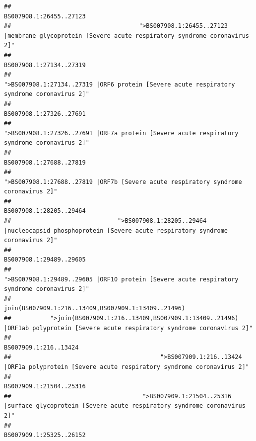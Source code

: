 \documentclass[
]{article}
\begin{document}
\begin{verbatim}
##                                                                                                                BS007908.1:26455..27123 
##                                    ">BS007908.1:26455..27123 |membrane glycoprotein [Severe acute respiratory syndrome coronavirus 2]" 
##                                                                                                                BS007908.1:27134..27319 
##                                             ">BS007908.1:27134..27319 |ORF6 protein [Severe acute respiratory syndrome coronavirus 2]" 
##                                                                                                                BS007908.1:27326..27691 
##                                            ">BS007908.1:27326..27691 |ORF7a protein [Severe acute respiratory syndrome coronavirus 2]" 
##                                                                                                                BS007908.1:27688..27819 
##                                                    ">BS007908.1:27688..27819 |ORF7b [Severe acute respiratory syndrome coronavirus 2]" 
##                                                                                                                BS007908.1:28205..29464 
##                              ">BS007908.1:28205..29464 |nucleocapsid phosphoprotein [Severe acute respiratory syndrome coronavirus 2]" 
##                                                                                                                BS007908.1:29489..29605 
##                                            ">BS007908.1:29489..29605 |ORF10 protein [Severe acute respiratory syndrome coronavirus 2]" 
##                                                                                    join(BS007909.1:216..13409,BS007909.1:13409..21496) 
##           ">join(BS007909.1:216..13409,BS007909.1:13409..21496) |ORF1ab polyprotein [Severe acute respiratory syndrome coronavirus 2]" 
##                                                                                                                  BS007909.1:216..13424 
##                                          ">BS007909.1:216..13424 |ORF1a polyprotein [Severe acute respiratory syndrome coronavirus 2]" 
##                                                                                                                BS007909.1:21504..25316 
##                                     ">BS007909.1:21504..25316 |surface glycoprotein [Severe acute respiratory syndrome coronavirus 2]" 
##                                                                                                                BS007909.1:25325..26152 

\end{verbatim}
\end{document}
